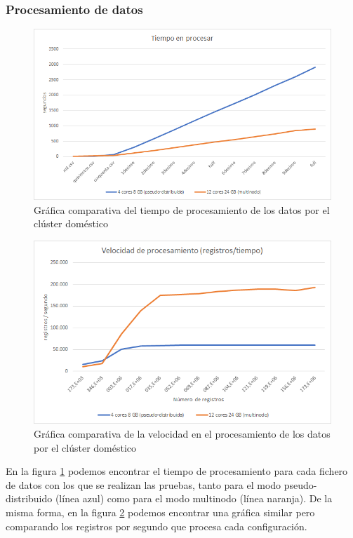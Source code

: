 \subsubsection{Procesamiento de datos}
\begin{figure}[htp!]
	\centering
	\caption{Gráfica comparativa del tiempo de procesamiento de los datos por el clúster doméstico}
	\label{gra:tiemProcDom}
	\vspace{5pt}
	\includegraphics[scale=0.8]{graficas/tpdom}
\end{figure}
\begin{figure}[htp!]
	\centering
	\caption{Gráfica comparativa de la velocidad en el procesamiento de los datos por el clúster doméstico}
	\label{gra:velProcDom}
	\vspace{5pt}
	\includegraphics[scale=0.85]{graficas/vpdom}
\end{figure}

En la figura \ref{gra:tiemProcDom} podemos encontrar el tiempo de procesamiento para cada fichero de datos con los que se realizan las pruebas, tanto para el modo pseudo-distribuido (línea azul) como para el modo multinodo (línea naranja). De la misma forma, en la figura \ref{gra:velProcDom} podemos encontrar una gráfica similar pero comparando los registros por segundo que procesa cada configuración.

